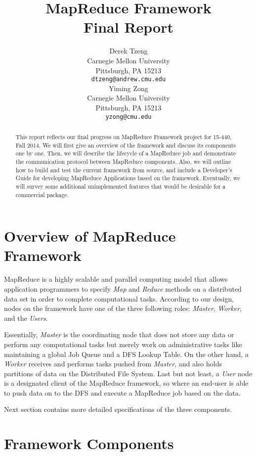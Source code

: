 \documentclass{article} %
\title{MapReduce Framework\\Final Report}
\author{
Derek Tzeng\\
Carnegie Mellon University\\
Pittsburgh, PA 15213 \\
\texttt{dtzeng@andrew.cmu.edu} \\
\And
Yiming Zong\\
Carnegie Mellon University\\
Pittsburgh, PA 15213 \\
\texttt{yzong@cmu.edu} \\
}
\begin{document}
\maketitle

\begin{abstract}
This report reflects our final progress on MapReduce Framework project for 15-440, Fall 2014. We will first give an overview of the framework and discuss its components one by one. Then, we will describe the lifecycle of a MapReduce job and demonstrate the communication protocol between MapReduce components. Also, we will outline how to build and test the current framework from source, and include a Developer's Guide for developing MapReduce Applications based on the framework. Eventually, we will survey some additional unimplemented features that would be desirable for a commercial package.
\end{abstract}

\section{Overview of MapReduce Framework}

\par\qquad MapReduce is a highly scalable and parallel computing model that allows application programmers to specify \emph{Map} and \emph{Reduce} methods on a distributed data set in order to complete computational tasks. According to our design, nodes on the framework have one of the three following roles: \emph{Master}, \emph{Worker}, and the \emph{Users}.
\par\qquad Essentially, \emph{Master} is the coordinating node that does not store any data or perform any computational tasks but merely work on administrative tasks like maintaining a global Job Queue and a DFS Lookup Table. On the other hand, a \emph{Worker} receives and performs tasks pushed from \emph{Master}, and also holds partitions of data on the Distributed File System. Last but not least, a \emph{User} node is a designated client of the MapReduce framework, so where an end-user is able to push data on to the DFS and execute a MapReduce job based on the data.
\par\qquad Next section contains more detailed specifications of the three components.

\section{Framework Components}
\end{document}
